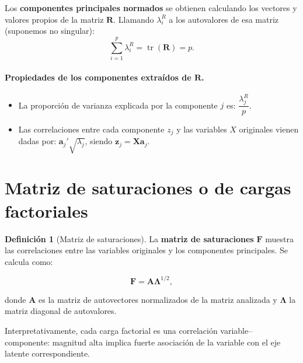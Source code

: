 \documentclass[12pt, a4paper]{article}
\theoremstyle{plain}
\theoremstyle{definition}
\newtheorem{definicion}[teorema]{Definición}
\theoremstyle{remark}
\newcommand{\mat}[1]{\mathbf{#1}}
\newcommand{\tr}{\operatorname{tr}}
\begin{document}
Los \textbf{componentes principales normados} se obtienen calculando los
vectores y valores propios de la matriz $\mat{R}$. Llamando $\lambda_i^R$ a
los autovalores de esa matriz (suponemos no singular):
\[
  \sum_{i=1}^p\lambda_i^R = \tr(\mat{R}) = p.
\]

\paragraph{Propiedades de los componentes extraídos de $\mat{R}$.}
\begin{itemize}
  \item La proporción de varianza explicada por la componente $j$ es:
        $\dfrac{\lambda_j^R}{p}$.
  \item Las correlaciones entre cada componente $z_j$ y las variables $X$
        originales vienen dadas por: $\mathbf{a}_j'\sqrt{\lambda_j}$,
        siendo $\mathbf{z}_j=\mathbf{X}\mathbf{a}_j$.
\end{itemize}

\section{Matriz de saturaciones o de cargas factoriales}

\begin{definicion}[Matriz de saturaciones]
La \textbf{matriz de saturaciones} $\mat{F}$ muestra las correlaciones entre
las variables originales y los componentes principales. Se calcula como:
\begin{mdframed}[style=resultado]
\[
  \mat{F} = \mat{A}\boldsymbol{\Lambda}^{1/2},
\]
\end{mdframed}
donde $\mat{A}$ es la matriz de autovectores normalizados de la matriz
analizada y $\boldsymbol{\Lambda}$ la matriz diagonal de autovalores.
\end{definicion}

Interpretativamente, cada carga factorial es una correlación variable--
componente: magnitud alta implica fuerte asociación de la variable con el eje
latente correspondiente.
\end{document}
